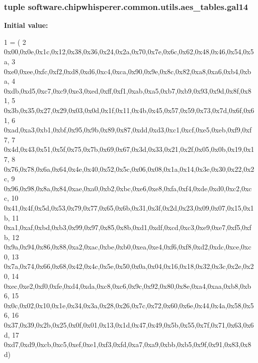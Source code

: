 \subsubsection[{gal14}]{\setlength{\rightskip}{0pt plus 5cm}tuple software.\+chipwhisperer.\+common.\+utils.\+aes\+\_\+tables.\+gal14}\label{namespacesoftware_1_1chipwhisperer_1_1common_1_1utils_1_1aes__tables_a0ca46da7cf1001b0a8c3a9e441e6ac43}
{\bfseries Initial value\+:}
\begin{DoxyCode}
1 = (
2 0x00,0x0e,0x1c,0x12,0x38,0x36,0x24,0x2a,0x70,0x7e,0x6c,0x62,0x48,0x46,0x54,0x5a,
3 0xe0,0xee,0xfc,0xf2,0xd8,0xd6,0xc4,0xca,0x90,0x9e,0x8c,0x82,0xa8,0xa6,0xb4,0xba,
4 0xdb,0xd5,0xc7,0xc9,0xe3,0xed,0xff,0xf1,0xab,0xa5,0xb7,0xb9,0x93,0x9d,0x8f,0x81,
5 0x3b,0x35,0x27,0x29,0x03,0x0d,0x1f,0x11,0x4b,0x45,0x57,0x59,0x73,0x7d,0x6f,0x61,
6 0xad,0xa3,0xb1,0xbf,0x95,0x9b,0x89,0x87,0xdd,0xd3,0xc1,0xcf,0xe5,0xeb,0xf9,0xf7,
7 0x4d,0x43,0x51,0x5f,0x75,0x7b,0x69,0x67,0x3d,0x33,0x21,0x2f,0x05,0x0b,0x19,0x17,
8 0x76,0x78,0x6a,0x64,0x4e,0x40,0x52,0x5c,0x06,0x08,0x1a,0x14,0x3e,0x30,0x22,0x2c,
9 0x96,0x98,0x8a,0x84,0xae,0xa0,0xb2,0xbc,0xe6,0xe8,0xfa,0xf4,0xde,0xd0,0xc2,0xcc,
10 0x41,0x4f,0x5d,0x53,0x79,0x77,0x65,0x6b,0x31,0x3f,0x2d,0x23,0x09,0x07,0x15,0x1b,
11 0xa1,0xaf,0xbd,0xb3,0x99,0x97,0x85,0x8b,0xd1,0xdf,0xcd,0xc3,0xe9,0xe7,0xf5,0xfb,
12 0x9a,0x94,0x86,0x88,0xa2,0xac,0xbe,0xb0,0xea,0xe4,0xf6,0xf8,0xd2,0xdc,0xce,0xc0,
13 0x7a,0x74,0x66,0x68,0x42,0x4c,0x5e,0x50,0x0a,0x04,0x16,0x18,0x32,0x3c,0x2e,0x20,
14 0xec,0xe2,0xf0,0xfe,0xd4,0xda,0xc8,0xc6,0x9c,0x92,0x80,0x8e,0xa4,0xaa,0xb8,0xb6,
15 0x0c,0x02,0x10,0x1e,0x34,0x3a,0x28,0x26,0x7c,0x72,0x60,0x6e,0x44,0x4a,0x58,0x56,
16 0x37,0x39,0x2b,0x25,0x0f,0x01,0x13,0x1d,0x47,0x49,0x5b,0x55,0x7f,0x71,0x63,0x6d,
17 0xd7,0xd9,0xcb,0xc5,0xef,0xe1,0xf3,0xfd,0xa7,0xa9,0xbb,0xb5,0x9f,0x91,0x83,0x8d)
\end{DoxyCode}
\hypertarget{namespacesoftware_1_1chipwhisperer_1_1common_1_1utils_1_1aes__tables_a0ac094d352370182a354f0e394cdeb5f}{}
